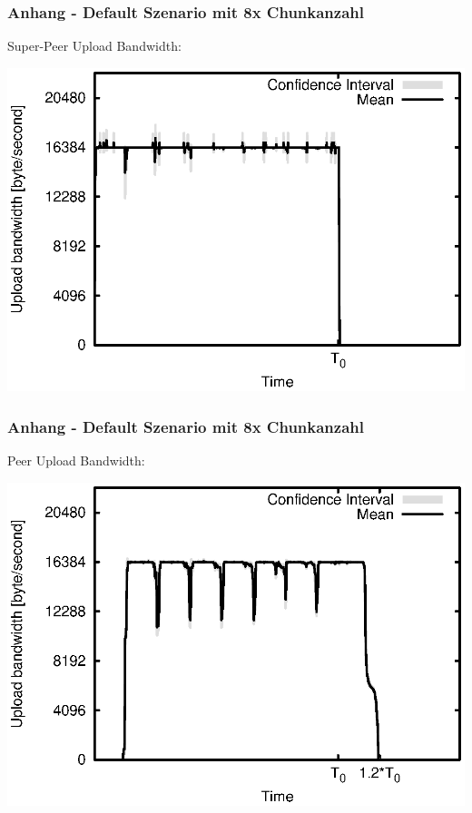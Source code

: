 \begin{frame}
  \frametitle{Anhang - Default Szenario mit 8x Chunkanzahl}
  Super-Peer Upload Bandwidth:
  
  \begin{center}
    \includegraphics[width=1\textwidth]{fig/plots/scenario_16_chunk_count_fac_8/plots/GeneratedMeanCurrentSuperSeederUploadBandwidth.csv.eps}
  \end{center}
\end{frame}


\begin{frame}
  \frametitle{Anhang - Default Szenario mit 8x Chunkanzahl}
  Peer Upload Bandwidth:
  
  \begin{center}
    \includegraphics[width=1\textwidth]{fig/plots/scenario_16_chunk_count_fac_8/plots/GeneratedMeanCurrentUploadBandwidth.csv.eps}
  \end{center}
\end{frame}


